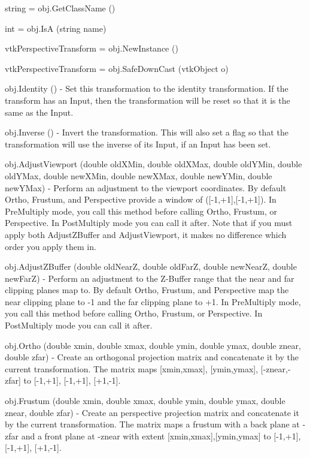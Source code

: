 \begin{DoxyItemize}
\item {\ttfamily string = obj.\-Get\-Class\-Name ()}  
\item {\ttfamily int = obj.\-Is\-A (string name)}  
\item {\ttfamily vtk\-Perspective\-Transform = obj.\-New\-Instance ()}  
\item {\ttfamily vtk\-Perspective\-Transform = obj.\-Safe\-Down\-Cast (vtk\-Object o)}  
\item {\ttfamily obj.\-Identity ()} -\/ Set this transformation to the identity transformation. If the transform has an Input, then the transformation will be reset so that it is the same as the Input.  
\item {\ttfamily obj.\-Inverse ()} -\/ Invert the transformation. This will also set a flag so that the transformation will use the inverse of its Input, if an Input has been set.  
\item {\ttfamily obj.\-Adjust\-Viewport (double old\-X\-Min, double old\-X\-Max, double old\-Y\-Min, double old\-Y\-Max, double new\-X\-Min, double new\-X\-Max, double new\-Y\-Min, double new\-Y\-Max)} -\/ Perform an adjustment to the viewport coordinates. By default Ortho, Frustum, and Perspective provide a window of (\mbox{[}-\/1,+1\mbox{]},\mbox{[}-\/1,+1\mbox{]}). In Pre\-Multiply mode, you call this method before calling Ortho, Frustum, or Perspective. In Post\-Multiply mode you can call it after. Note that if you must apply both Adjust\-Z\-Buffer and Adjust\-Viewport, it makes no difference which order you apply them in.  
\item {\ttfamily obj.\-Adjust\-Z\-Buffer (double old\-Near\-Z, double old\-Far\-Z, double new\-Near\-Z, double new\-Far\-Z)} -\/ Perform an adjustment to the Z-\/\-Buffer range that the near and far clipping planes map to. By default Ortho, Frustum, and Perspective map the near clipping plane to -\/1 and the far clipping plane to +1. In Pre\-Multiply mode, you call this method before calling Ortho, Frustum, or Perspective. In Post\-Multiply mode you can call it after.  
\item {\ttfamily obj.\-Ortho (double xmin, double xmax, double ymin, double ymax, double znear, double zfar)} -\/ Create an orthogonal projection matrix and concatenate it by the current transformation. The matrix maps \mbox{[}xmin,xmax\mbox{]}, \mbox{[}ymin,ymax\mbox{]}, \mbox{[}-\/znear,-\/zfar\mbox{]} to \mbox{[}-\/1,+1\mbox{]}, \mbox{[}-\/1,+1\mbox{]}, \mbox{[}+1,-\/1\mbox{]}.  
\item {\ttfamily obj.\-Frustum (double xmin, double xmax, double ymin, double ymax, double znear, double zfar)} -\/ Create an perspective projection matrix and concatenate it by the current transformation. The matrix maps a frustum with a back plane at -\/zfar and a front plane at -\/znear with extent \mbox{[}xmin,xmax\mbox{]},\mbox{[}ymin,ymax\mbox{]} to \mbox{[}-\/1,+1\mbox{]}, \mbox{[}-\/1,+1\mbox{]}, \mbox{[}+1,-\/1\mbox{]}.  

\end{DoxyItemize}
